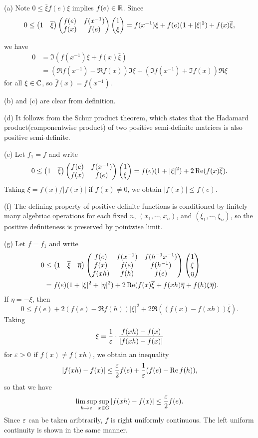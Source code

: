 \documentclass[a4paper]{article}
\begin{document}
\begin{pf}
(a)
Note $0\le\bar\xi f(e)\xi$ implies $f(e)\in\mathbb{R}$.
Since
\[0\le\begin{pmatrix}1&\overline\xi\end{pmatrix}\begin{pmatrix}f(e)&f(x^{-1})\\f(x)&f(e)\end{pmatrix}\begin{pmatrix}1\\\xi\end{pmatrix}=f(x^{-1})\xi+f(e)(1+|\xi|^2)+f(x)\overline\xi,\]

we have
\begin{align*}
0&=\Im(f(x^{-1})\xi+f(x)\bar\xi)\\
&=(\Re f(x^{-1})-\Re f(x))\Im\xi+(\Im f(x^{-1})+\Im f(x))\Re\xi
\end{align*}
for all $\xi\in\mathbb{C}$, so $\bar f(x)=f(x^{-1})$.

(b) and (c) are clear from definition.

(d) It follows from the Schur product theorem, which states that the Hadamard product(componentwise product) of two positive semi-definite matrices is also positive semi-definite.

(e)
Let $f_1=f$ and write
\[0\le\begin{pmatrix}1&\overline\xi\end{pmatrix}\begin{pmatrix}f(e)&f(x^{-1})\\f(x)&f(e)\end{pmatrix}\begin{pmatrix}1\\\xi\end{pmatrix}=f(e)(1+|\xi|^2)+2\operatorname{Re}(f(x)\overline\xi).\]
Taking $\xi=f(x)/|f(x)|$ if $f(x)\ne0$, we obtain $|f(x)|\le f(e)$.

(f)
The defining property of positive definite functions is conditioned by finitely many algebriac operations for each fixed $n$, $(x_1,\cdots,x_n)$, and $(\xi_1,\cdots,\xi_n)$, so the positive definiteness is preserved by pointwise limit.

(g)
Let $f=f_1$ and write
\begin{align*}
0&\le\begin{pmatrix}1&\overline\xi&\overline\eta\end{pmatrix}\begin{pmatrix}f(e)&f(x^{-1})&f(h^{-1}x^{-1})\\f(x)&f(e)&f(h^{-1})\\f(xh)&f(h)&f(e)\end{pmatrix}\begin{pmatrix}1\\\xi\\\eta\end{pmatrix}\\
&=f(e)(1+|\xi|^2+|\eta|^2)+2\operatorname{Re}(f(x)\overline\xi+f(xh)\overline\eta+f(h)\xi\overline\eta).
\end{align*}
If $\eta=-\xi$, then
\[0\le f(e)+2(f(e)-\Re f(h))|\xi|^2+2\Re((f(x)-f(xh))\bar\xi).\]
Taking
\[\xi=\frac1{\varepsilon}\cdot\frac{f(xh)-f(x)}{|f(xh)-f(x)|}\]
for $\varepsilon>0$ if $f(x)\ne f(xh)$, we obtain an inequality
\[|f(xh)-f(x)|\le\frac{\varepsilon}2f(e)+\frac1{\varepsilon}(f(e)-\operatorname{Re} f(h)),\]
so that we have
\[\limsup_{h\to e}\sup_{x\in G}|f(xh)-f(x)|\le\frac{\varepsilon}2f(e).\]
Since $\varepsilon$ can be taken aribtrarily, $f$ is right uniformly continuous.
The left uniform continuity is shown in the same manner.
\end{pf}
\end{document}
